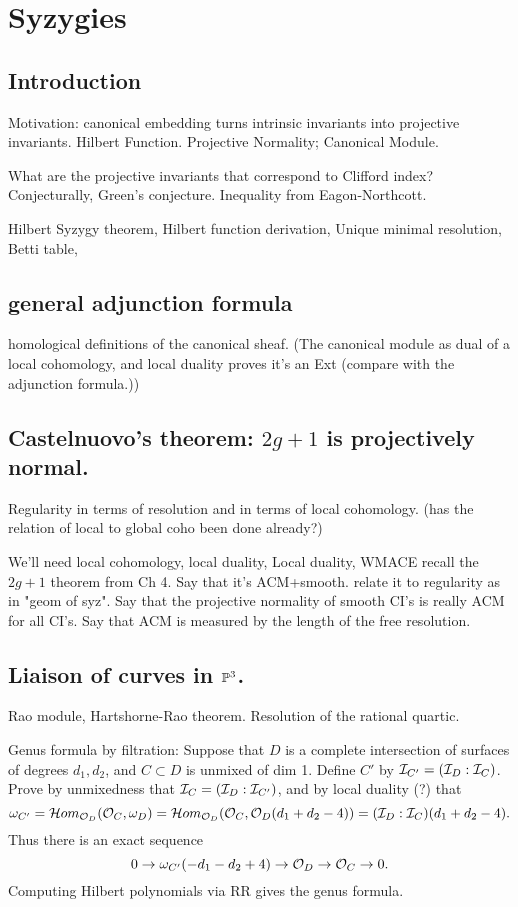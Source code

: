 

\chapter{Syzygies}
\label{SyzygiesChapter}

\section{Introduction} Motivation: canonical embedding turns intrinsic invariants into projective invariants. Hilbert Function. Projective Normality; Canonical Module.

What are the projective invariants that correspond to Clifford index? Conjecturally, Green's conjecture. Inequality from Eagon-Northcott.

Hilbert Syzygy theorem, Hilbert function derivation, Unique minimal resolution, Betti table, 

\section {general adjunction formula} homological definitions of the canonical sheaf. (The canonical module as dual of a local cohomology, 
and local duality proves it's  an Ext (compare with the adjunction formula.))



\section{Castelnuovo's theorem: $2g+1$ is projectively normal.}

 Regularity in terms of resolution and in terms of local cohomology. (has the relation of local to global coho been done already?)

We'll need local cohomology, local duality, 
 Local duality, WMACE
recall the $2g+1$ theorem from Ch 4. Say that it's ACM+smooth. relate it to regularity as in "geom of syz". Say that the projective
normality of smooth CI's is really ACM for all CI's. Say that ACM is measured by the length of the free resolution.

\section{Liaison of curves in $\PP^3$.}
Rao module, Hartshorne-Rao theorem. Resolution of the rational quartic.

Genus formula by filtration: Suppose that $D$ is a complete intersection of surfaces of degrees $d_1,d_2$, and 
$C\subset D$ is unmixed of dim 1. Define $C'$ by $\cI_{C'} = (\cI_D:\cI_C)$. Prove by unmixedness that 
$\cI_C = (\cI_D:\cI_{C'})$,  and by local duality (?) that 
$$
\omega_{C'} = \cHom_{\cO_D}(\cO_C, \omega_D) = 
\cHom_{\cO_D}(\cO_C, \cO_D(d_1+d_2-4))
=  (\cI_D:\cI_C)(d_1+d_2-4).
$$
Thus there is an exact sequence
$$
0\to \omega_{C'}(-d_1-d_2+4) \to \cO_D \to \cO_C \to 0.
$$
Computing Hilbert polynomials via RR gives the genus formula.

